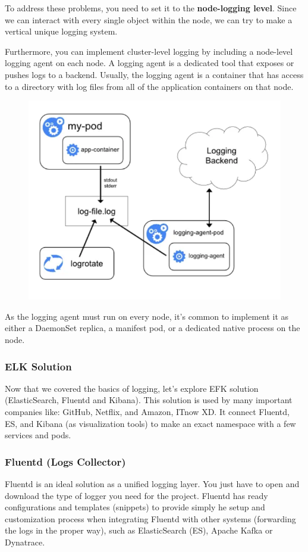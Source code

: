 \documentclass{article}
\begin{document}
To address these problems, you need to set it to the \textbf{node-logging level}. Since we can interact with every single object within the node, we can try to make a vertical unique logging system. 

Furthermore, you can implement cluster-level logging by including a node-level logging agent on each node. A logging agent is a dedicated tool that exposes or pushes logs to a backend. Usually, the logging agent is a container that has access to a directory with log files from all of the application containers on that node.

\begin{figure}[H]
    \includegraphics[width=\textwidth]{pictures/loggingsol.png}
\end{figure}

As the logging agent must run on every node, it's common to implement it as either a DaemonSet replica, a manifest pod, or a dedicated native process on the node.

\subsubsection{ELK Solution}

Now that we covered the basics of logging, let's explore EFK solution (ElasticSearch, Fluentd and Kibana). This solution is used by many important companies like: GitHub, Netflix, and Amazon, ITnow XD. It connect Fluentd, ES, and Kibana (as visualization tools) to make an exact namespace with a few services and pods.

\subsubsection{Fluentd (Logs Collector)}
Fluentd is an ideal solution as a unified logging layer. You just have to open and download the type of logger you need for the project.
Fluentd has ready configurations and templates (snippets) to provide simply he setup and customization process when integrating Fluentd with other systems (forwarding the logs in the proper way), such as ElasticSearch (ES), Apache Kafka or Dynatrace.
\end{document}
